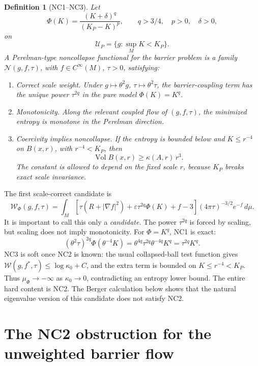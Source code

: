 \documentclass[11pt]{amsart}
\newtheorem{definition}{Definition}
\newcommand{\KP}{K_{\!P}}
\newcommand{\U}{\mathcal U}
\newcommand{\Wcal}{\mathcal W}
\newcommand{\Ncal}{\mathcal N}
\newcommand{\Vol}{\operatorname{Vol}}
\begin{document}
\begin{definition}[NC1--NC3]\label{def:NC}
Let
\[
        \Phi(K)=\frac{(K+\delta)^q}{(\KP-K)^p},
        \qquad q>3/4,\quad p>0,\quad \delta>0,
\]
on
\[
        \U_P=\{g:\sup_MK<\KP\}.
\]
A Perelman-type noncollapse functional for the barrier problem is a family
\(\Ncal(g,f,\tau)\), with \(f\in C^\infty(M)\), \(\tau>0\), satisfying:

\begin{enumerate}[label=\textbf{NC\arabic*.}]
\item \emph{Correct scale weight.}  Under
\(g\mapsto\theta^2g\), \(\tau\mapsto\theta^2\tau\), the barrier-coupling term
has the unique power \(\tau^{2q}\) in the pure model \(\Phi(K)=K^q\).

\item \emph{Monotonicity.}  Along the relevant coupled flow of
\((g,f,\tau)\), the minimized entropy is monotone in the Perelman direction.

\item \emph{Coercivity implies noncollapse.}  If the entropy is bounded below
and \(K\le r^{-4}\) on \(B(x,r)\), with \(r^{-4}<\KP\), then
\[
        \Vol B(x,r)\ge \kappa(A,r)\,r^3 .
\]
The constant is allowed to depend on the fixed scale \(r\), because \(\KP\)
breaks exact scale invariance.
\end{enumerate}
\end{definition}

The first scale-correct candidate is
\[
        \Wcal_\Phi(g,f,\tau)
        =
        \int_M
        \left[
        \tau(R+|\nabla f|^2)
        +
        \varepsilon\tau^{2q}\Phi(K)
        +
        f-3
        \right]
        (4\pi\tau)^{-3/2}e^{-f}\,d\mu .
\]
It is important to call this only a \emph{candidate}.  The power
\(\tau^{2q}\) is forced by scaling, but scaling does not imply monotonicity.
For \(\Phi=K^q\), NC1 is exact:
\[
        (\theta^2\tau)^{2q}\Phi(\theta^{-4}K)
        =
        \theta^{4q}\tau^{2q}\theta^{-4q}K^q
        =
        \tau^{2q}K^q .
\]
NC3 is soft once NC2 is known: the usual collapsed-ball test function gives
\(\Wcal(g,f^\ast,\tau)\le\log\kappa_0+C\), and the extra term is bounded on
\(K\le r^{-4}<\KP\).  Thus \(\mu_\Phi\to-\infty\) as \(\kappa_0\to0\),
contradicting an entropy lower bound.  The entire hard content is NC2.  The
Berger calculation below shows that the natural eigenvalue version of this
candidate does not satisfy NC2.

\section{The NC2 obstruction for the unweighted barrier flow}
\end{document}
